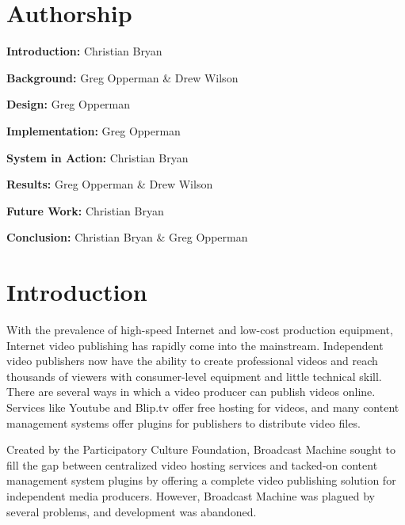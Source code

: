 \documentclass[a4paper,12pt]{report}
\begin{document}
\chapter*{Authorship}
\begin{description}
  \item{\textbf{Introduction: }Christian Bryan}
  \item{\textbf{Background: }Greg Opperman & Drew Wilson}
  \item{\textbf{Design: }Greg Opperman}
  \item{\textbf{Implementation: }Greg Opperman}
  \item{\textbf{System in Action: }Christian Bryan}
  \item{\textbf{Results: } Greg Opperman \& Drew Wilson}
  \item{\textbf{Future Work: }Christian Bryan}
    \item{\textbf{Conclusion: }Christian Bryan \& Greg Opperman}
\end{description}

\tableofcontents

\chapter{Introduction}
With the prevalence of high-speed Internet and low-cost production equipment, Internet video publishing has rapidly come into the 
mainstream. Independent video publishers now have the ability to create professional videos and reach thousands of viewers with consumer-level equipment and little technical skill. There are several ways in which a video producer can publish videos online. Services like Youtube and Blip.tv offer free hosting for videos, and many content management systems offer plugins for publishers to distribute video files.

Created by the Participatory Culture Foundation, Broadcast Machine sought to fill the gap between centralized video hosting services and tacked-on content management system plugins by offering a complete video publishing solution for independent media producers. However, Broadcast Machine was plagued by several problems, and development was abandoned.
\end{document}
